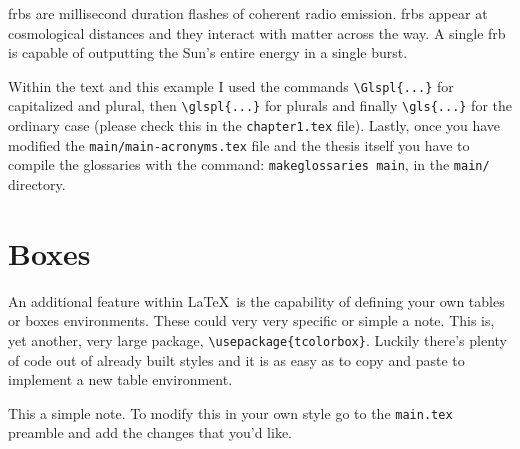 \Glspl{frb} are millisecond duration flashes of coherent radio emission. \glspl{frb} appear at cosmological distances and they interact with matter across the way. A single \gls{frb} is capable of outputting the Sun's entire energy in a single burst.

Within the text and this example I used the commands \verb|\Glspl{...}| for capitalized and plural, then \verb|\glspl{...}| for plurals and finally \verb|\gls{...}| for the ordinary case (please check this in the \texttt{chapter1.tex} file).
Lastly, once you have modified the \texttt{main/main-acronyms.tex} file and the thesis itself you have to compile the glossaries with the command: \texttt{makeglossaries main}, in the \texttt{main/} directory.


\section{Boxes}

An additional feature within \LaTeX\ is the capability of defining your own tables or boxes environments. These could very very specific or simple a note. This is, yet another, very large package, \verb|\usepackage{tcolorbox}|. Luckily there's plenty of code out of already built styles and it is as easy as to copy and paste to implement a new table environment.

\begin{note}
  This a simple note. To modify this in your own style go to the \texttt{main.tex} preamble and add the changes that you'd like.
\end{note}